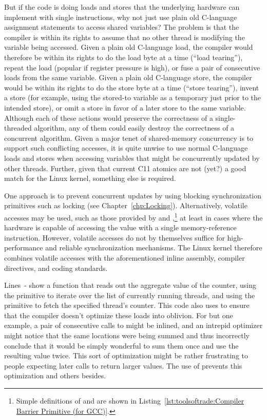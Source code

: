 \begin{lineref}
{	But if the code is doing loads and stores that the underlying
	hardware can implement with single instructions, why not just
	use plain old C-language assignment statements to access shared
	variables?
	The problem is that the compiler is within its rights to assume
	that no other thread is modifying the variable being accessed.
	Given a plain old C-language load, the compiler would therefore
	be within its rights to do the load byte at a time
	(``load tearing''), repeat the load (popular if register
	pressure is high), or fuse a pair of consecutive loads from
	the same variable.
	Given a plain old C-language store, the compiler would be within
	its rights to do the store byte at a time (``store tearing''),
	invent a store (for example, using the stored-to variable as
	a temporary just prior to the intended store), or omit a store
	in favor of a later store to the same variable.
	Although each of these actions would preserve the correctness
	of a single-threaded algorithm, any of them could easily destroy
	the correctness of a concurrent algorithm.
	Given a major tenet of shared-memory concurrency is to support
	such conflicting accesses, it is quite unwise to use normal
	C-language loads and stores when accessing variables that might
	be concurrently updated by other threads.
	Further, given that current C11 atomics are not (yet?) a good
	match for the Linux kernel, something else is required.

	One approach is to prevent concurrent updates by using
	blocking synchronization primitives such as locking
	(see Chapter~\ref{chp:Locking}).
	Alternatively, volatile accesses may be used, such as those provided
	by  and ,\footnote{
		Simple definitions of  and
		 are shown in
		Listing~\ref{lst:toolsoftrade:Compiler Barrier Primitive (for GCC)}.}
	at least in cases where the hardware is capable of accessing
	the value with a single memory-reference instruction.
	However, volatile accesses do not by themselves suffice for
	high-performance and reliable synchronization mechanisms.
	The Linux kernel therefore combines volatile accesses with
	the aforementioned inline assembly, compiler directives, and
	coding standards.
} \QuickQuizEnd

Lines~-
show a function that reads out the aggregate value of the counter,
using the  primitive to iterate over the list of
currently running threads, and using the  primitive
to fetch the specified thread's counter.
This code also uses  to ensure that the compiler doesn't
optimize these loads into oblivion.
For but one example, a pair of consecutive calls to 
might be inlined, and an intrepid optimizer might notice that the same
locations were being summed and thus incorrectly conclude that it would
be simply wonderful to sum them once and use the resulting value twice.
This sort of optimization might be rather frustrating to people expecting
later  calls to return larger values.
The use of  prevents this optimization and others besides.
\end{lineref}

